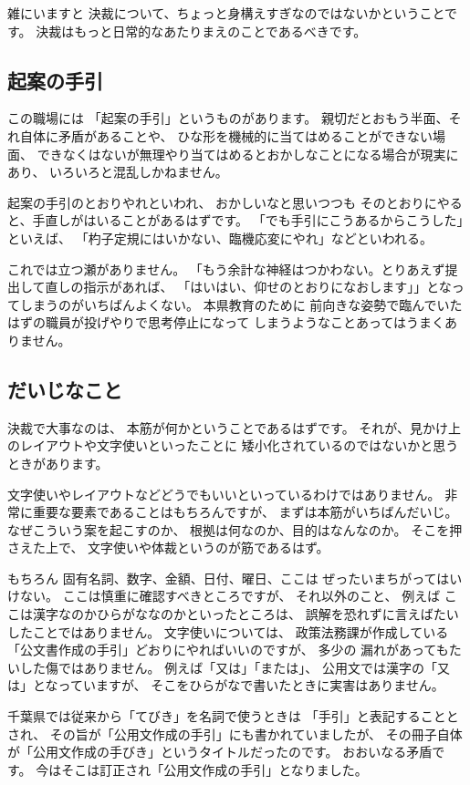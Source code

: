\documentclass[uplatex,jis2004,dvipdfmx,12pt]{jsarticle}
\begin{document}
雑にいますと
決裁について、ちょっと身構えすぎなのではないかということです。
決裁はもっと日常的なあたりまえのことであるべきです。

\subsection{起案の手引}
この職場には
「起案の手引」というものがあります。
親切だとおもう半面、それ自体に矛盾があることや、
ひな形を機械的に当てはめることができない場面、
できなくはないが無理やり当てはめるとおかしなことになる場合が現実にあり、
いろいろと混乱しかねません。

起案の手引のとおりやれといわれ、
おかしいなと思いつつも
そのとおりにやると、手直しがはいることがあるはずです。
「でも手引にこうあるからこうした」といえば、
「杓子定規にはいかない、臨機応変にやれ」などといわれる。

これでは立つ瀬がありません。
「もう余計な神経はつかわない。とりあえず提出して直しの指示があれば、
「はいはい、仰せのとおりになおします」」となってしまうのがいちばんよくない。
本県教育のために
前向きな姿勢で臨んでいたはずの職員が投げやりで思考停止になって
しまうようなことあってはうまくありません。

\subsection{だいじなこと}
決裁で大事なのは、
本筋が何かということであるはずです。
それが、見かけ上のレイアウトや文字使いといったことに
矮小化されているのではないかと思うときがあります。

文字使いやレイアウトなどどうでもいいといっているわけではありません。
非常に重要な要素であることはもちろんですが、
まずは本筋がいちばんだいじ。
なぜこういう案を起こすのか、
根拠は何なのか、目的はなんなのか。
そこを押さえた上で、
文字使いや体裁というのが筋であるはず。

もちろん
固有名詞、数字、金額、日付、曜日、ここは
ぜったいまちがってはいけない。
ここは慎重に確認すべきところですが、
それ以外のこと、
例えば
ここは漢字なのかひらがななのかといったところは、
誤解を恐れずに言えばたいしたことではありません。
文字使いについては、
政策法務課が作成している「公文書作成の手引」どおりにやればいいのですが、
多少の
漏れがあってもたいした傷ではありません。
例えば「又は」「または」、
公用文では漢字の「又は」となっていますが、
そこをひらがなで書いたときに実害はありません。

千葉県では従来から「てびき」を名詞で使うときは
「手引」と表記することとされ、
その旨が「公用文作成の手引」にも書かれていましたが、
その冊子自体が「公用文作成の手びき」というタイトルだったのです。
おおいなる矛盾です。
今はそこは訂正され「公用文作成の手引」となりました。
\end{document}
